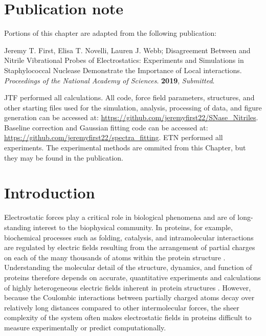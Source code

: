 \section{Publication note} \label{snase-pub-note}

Portions of this chapter are adapted from the following publication:

\noindent Jeremy T. First, Elisa T. Novelli, Lauren J. Webb; Disagreement Between \pKa{} and Nitrile Vibrational Probes of Electrostatics: Experiments and Simulations in Staphylococcal Nuclease Demonstrate the Importance of Local interactions. \emph{Proceedings of the National Academy of Sciences}. \textbf{2019}, \emph{Submitted}. 

JTF performed all calculations.
All code, force field parameters, structures, and other starting files used for the simulation, analysis, processing of data, and figure generation can be accessed at:
\url{https://github.com/jeremyfirst22/SNase_Nitriles}. 
Baseline correction and Gaussian fitting code can be accessed at: 
\url{https://github.com/jeremyfirst22/spectra_fitting}. 
ETN performed all experiments. The experimental methods are ommited from this Chapter, but they may be found in the publication.

\section{Introduction} \label{snase-intro}

Electrostatic forces play a critical role in biological phenomena and are of long-standing interest to the biophysical community. 
In proteins, for example, biochemical processes such as folding, catalysis, and intramolecular interactions are regulated by electric fields resulting from the arrangement of partial charges on each of the many thousands of atoms within the protein structure \cite{Honig1995}. 
Understanding the molecular detail of the structure, dynamics, and function of proteins therefore depends on accurate, quantitative experiments and calculations of highly heterogeneous electric fields inherent in protein structures \cite{Warshel1978}. 
However, because the Coulombic interactions between partially charged atoms decay over relatively long distances compared to other intermolecular forces, the sheer complexity of the system often makes electrostatic fields in proteins difficult to measure experimentally or predict computationally.

